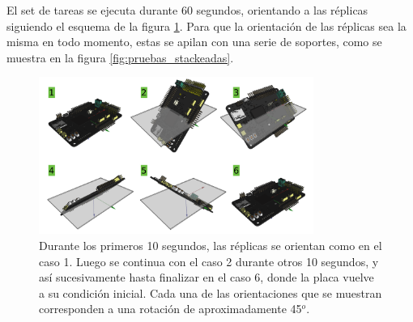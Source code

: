 El set de tareas se ejecuta durante 60 segundos, orientando a las réplicas siguiendo el esquema de la figura \ref{fig:orientaciones_prueba}. Para que la orientación de las réplicas sea la misma en todo momento, estas se apilan con una serie de soportes, como se muestra en la figura \ref{fig:pruebas_stackeadas}.

\begin{figure}[!t]
    \centering
    \includegraphics[width=0.8\textwidth]{img/orientaciones_prueba.png}
    \caption{Durante los primeros 10 segundos, las réplicas se orientan como en el caso 1. Luego se continua con el caso 2 durante otros 10 segundos, y así sucesivamente hasta finalizar en el caso 6, donde la placa vuelve a su condición inicial. Cada una de las orientaciones que se muestran corresponden a una rotación de aproximadamente 45$^o$.}
    \label{fig:orientaciones_prueba}
\end{figure}


